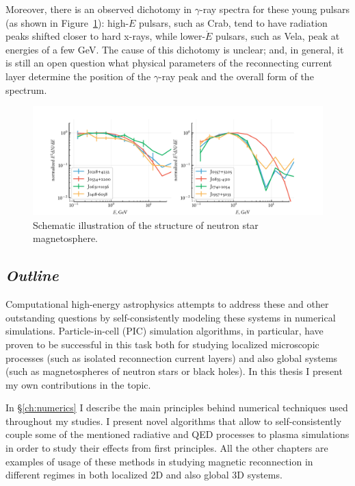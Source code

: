 Moreover, there is an observed dichotomy in $\gamma$-ray spectra for these young pulsars (as shown in Figure~\ref{fig:intro-psrspectra}): high-$\dot{E}$ pulsars, such as Crab, tend to have radiation peaks shifted closer to hard x-rays, while lower-$\dot{E}$ pulsars, such as Vela, peak at energies of a few GeV. The cause of this dichotomy is unclear; and, in general, it is still an open question what physical parameters of the reconnecting current layer determine the position of the $\gamma$-ray peak and the overall form of the spectrum.

\begin{figure}[htb]
    \centering
    \includegraphics[width=1\textwidth]{figures/intro/highlow_edot.pdf}
    \caption{Schematic illustration of the structure of neutron star magnetosphere.}
    \label{fig:intro-psrspectra}
\end{figure}

\subsection*{\small \it Outline}

Computational high-energy astrophysics attempts to address these and other outstanding questions by self-consistently modeling these systems in numerical simulations. Particle-in-cell (PIC) simulation algorithms, in particular, have proven to be successful in this task both for studying localized microscopic processes (such as isolated reconnection current layers) and also global systems (such as magnetospheres of neutron stars or black holes). In this thesis I present my own contributions in the topic. 

In \S\ref{ch:numerics} I describe the main principles behind numerical techniques used throughout my studies. I present novel algorithms that allow to self-consistently couple some of the mentioned radiative and QED processes to plasma simulations in order to study their effects from first principles. All the other chapters are examples of usage of these methods in studying magnetic reconnection in different regimes in both localized 2D and also global 3D systems.

